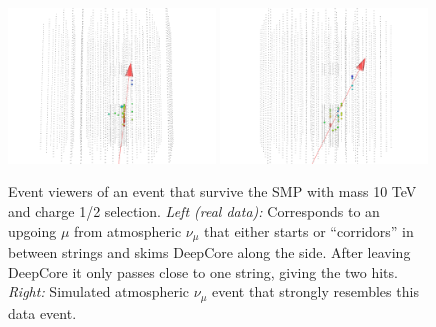 \begin{appendices}
\begin{figure}
\centering
\includegraphics[width=0.49\textwidth]{appendix/img/FINAL_data_m_10000_ch1ovr2_2.png}
\includegraphics[width=0.49\textwidth]{appendix/img/FINAL_data_m_10000_ch1ovr2_2_NUMUANALOGY.png}
\caption{Event viewers of an event that survive the SMP with mass 10 TeV and charge 1/2 selection. \textit{Left (real data): }Corresponds to an upgoing $\mu$ from atmospheric $\nu_\mu$ that either starts or ``corridors'' in between strings and skims DeepCore along the side. After leaving DeepCore it only passes close to one string, giving the two hits. \textit{Right: }Simulated atmospheric $\nu_\mu$ event that strongly resembles this data event.}
\label{fig:final_1}
\end{figure}


\end{appendices}
